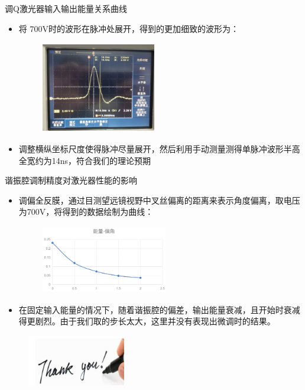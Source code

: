 \documentclass{beamer}
\begin{document}
\begin{frame}{调Q激光器输入输出能量关系曲线}
  \begin{itemize}
    \item 将 700V时的波形在脉冲处展开，得到的更加细致的波形为：
    \begin{figure}
      \includegraphics[height=4cm,width=5cm]{images/13.jpg}
      \label{fg7}
    \end{figure}
    \item 调整横纵坐标尺度使得脉冲尽量展开，然后利用手动测量测得单脉冲波形半高全宽约为14ns，符合我们的理论预期
  \end{itemize}
\end{frame}
\begin{frame}{谐振腔调制精度对激光器性能的影响}
  \begin{itemize}
    \item 调偏全反膜，通过目测望远镜视野中叉丝偏离的距离来表示角度偏离，取电压为700V，将得到的数据绘制为曲线：
    \begin{figure}
      \includegraphics[height=3cm,width=5.5cm]{images/14.png}
      \label{fg7}
    \end{figure}
    \item 在固定输入能量的情况下，随着谐振腔的偏差，输出能量衰减，且开始时衰减得更剧烈。由于我们取的步长太大，这里并没有表现出微调时的结果。
  \end{itemize}
\end{frame}


\begin{frame}
    \begin{figure}
      \includegraphics[height=2.23cm,width=4.29cm]{images/thank.jpg}
      \label{fg7}
    \end{figure}
   
\end{frame}
\end{document}
